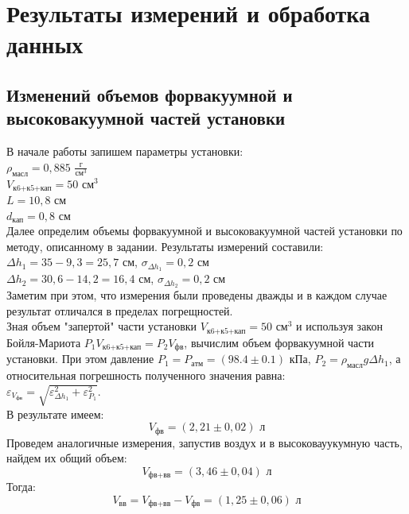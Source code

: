 \documentclass[a4paper, 12pt]{article}
\begin{document}
\section{Результаты измерений и обработка данных}
\subsection{Изменений объемов форвакуумной и высоковакуумной частей установки}
В начале работы запишем параметры установки:\\
$\rho_{масл} = 0,885$ $\frac{\text{г}}{\text{см}^3}$\\
$V_{\text{к6+к5+кап}}= 50$ $\text{см}^3$\\
$L = 10,8$ $\text{см}$\\
$d_{\text{кап}} = 0,8$ $\text{см}$\\
Далее определим объемы форвакуумной и высоковакуумной частей установки по методу, описанному в задании. Результаты измерений составили:\\
$\Delta h_1 = 35 - 9,3 = 25,7$ $\text{см}$, $\sigma_{\Delta h_1} = 0,2$ $\text{см}$\\
$\Delta h_2 = 30,6 - 14,2 = 16,4$ $\text{см}$, $\sigma_{\Delta h_2} = 0,2$ $\text{см}$\\
Заметим при этом, что измерения были проведены дважды и в каждом случае результат отличался в пределах погрещностей.\\
Зная объем "запертой" части установки $V_{\text{к6+к5+кап}} = 50$ $\text{см}^3$ и используя закон Бойля-Мариота $P_\text{1} V_{\text{к6+к5+кап}} = P_2 V_{\text{фв}}$, вычислим объем форвакуумной части установки. При этом давление $P_1 = P_{атм} = (98.4 \pm 0.1)$ $\text{кПа}$, $P_2 =   \rho_{масл} g \Delta h_1$, а относительная погрешность полученного значения равна:\\
$\varepsilon_{V_{\text{фв}}} = \sqrt{\varepsilon_{\Delta h_1}^2 + \varepsilon_{P_1}^2}$.\\
В результате имеем: 
\begin{equation}
    V_{\text{фв}} = (2,21 \pm 0,02) \text{ л}
\end{equation}
Проведем аналогичные измерения, запустив воздух и в высоковауукумную часть, найдем их общий объем:\\
\begin{equation}
    V_{\text{фв+вв}} = (3,46 \pm 0,04) \text{ л}
\end{equation}
Тогда:
\begin{equation}
    V_{\text{вв}} = V_{\text{фв+вв}} - V_{\text{фв}} = (1,25 \pm 0,06) \text{ л}
\end{equation}
\end{document}
